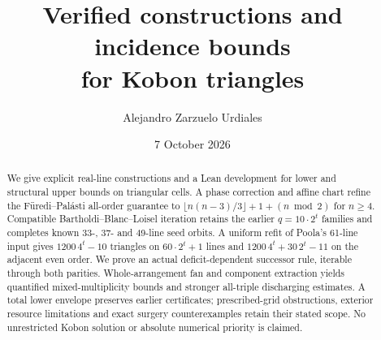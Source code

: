 \documentclass[11pt,a4paper]{article}
\title{Verified constructions and incidence bounds\\for Kobon triangles}
\author{Alejandro Zarzuelo Urdiales}
\date{7 October 2026}
\theoremstyle{definition}
\theoremstyle{remark}
\begin{document}
\maketitle
\begin{abstract}
We give explicit real-line constructions and a Lean development for lower and structural upper bounds on triangular cells. A phase correction and affine chart refine the F\"uredi--Pal\'asti all-order guarantee to $\lfloor n(n-3)/3\rfloor+1+(n\bmod2)$ for $n\ge4$. Compatible Bartholdi--Blanc--Loisel iteration retains the earlier $q=10\cdot2^t$ families and completes known 33-, 37- and 49-line seed orbits. A uniform refit of Poola's 61-line input gives $1200\,4^t-10$ triangles on $60\cdot2^t+1$ lines and $1200\,4^t+30\,2^t-11$ on the adjacent even order. We prove an actual deficit-dependent successor rule, iterable through both parities. Whole-arrangement fan and component extraction yields quantified mixed-multiplicity bounds and stronger all-triple discharging estimates. A total lower envelope preserves earlier certificates; prescribed-grid obstructions, exterior resource limitations and exact surgery counterexamples retain their stated scope. No unrestricted Kobon solution or absolute numerical priority is claimed.
\end{abstract}







\begingroup
\small
\setlength{\bibsep}{3pt}


\endgroup
\end{document}
